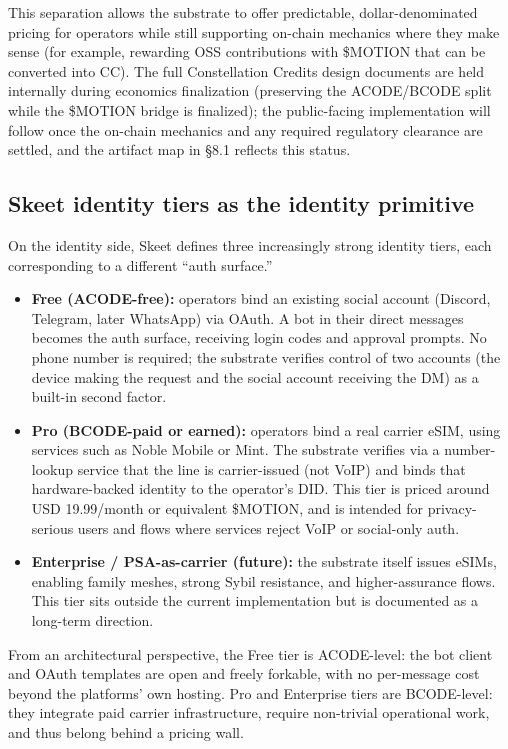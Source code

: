 \documentclass{article}
\providecommand{\tightlist}{\setlength{\itemsep}{0pt}\setlength{\parskip}{0pt}}
\begin{document}
This separation allows the substrate to offer predictable,
dollar-denominated pricing for operators while still supporting on-chain
mechanics where they make sense (for example, rewarding OSS
contributions with \$MOTION that can be converted into CC). The full
Constellation Credits design documents are held internally during
economics finalization (preserving the ACODE/BCODE split while the
\$MOTION bridge is finalized); the public-facing implementation will
follow once the on-chain mechanics and any required regulatory clearance
are settled, and the artifact map in §8.1 reflects this status.

\subsection{Skeet identity tiers as the identity
primitive}\label{skeet-identity-tiers-as-the-identity-primitive}

On the identity side, Skeet defines three increasingly strong identity
tiers, each corresponding to a different ``auth surface.''

\begin{itemize}
\tightlist
\item
  \textbf{Free (ACODE-free):} operators bind an existing social account
  (Discord, Telegram, later WhatsApp) via OAuth. A bot in their direct
  messages becomes the auth surface, receiving login codes and approval
  prompts. No phone number is required; the substrate verifies control
  of two accounts (the device making the request and the social account
  receiving the DM) as a built-in second factor.
\item
  \textbf{Pro (BCODE-paid or earned):} operators bind a real carrier
  eSIM, using services such as Noble Mobile or Mint. The substrate
  verifies via a number-lookup service that the line is carrier-issued
  (not VoIP) and binds that hardware-backed identity to the operator's
  DID. This tier is priced around USD 19.99/month or equivalent
  \$MOTION, and is intended for privacy-serious users and flows where
  services reject VoIP or social-only auth.
\item
  \textbf{Enterprise / PSA-as-carrier (future):} the substrate itself
  issues eSIMs, enabling family meshes, strong Sybil resistance, and
  higher-assurance flows. This tier sits outside the current
  implementation but is documented as a long-term direction.
\end{itemize}

From an architectural perspective, the Free tier is ACODE-level: the bot
client and OAuth templates are open and freely forkable, with no
per-message cost beyond the platforms' own hosting. Pro and Enterprise
tiers are BCODE-level: they integrate paid carrier infrastructure,
require non-trivial operational work, and thus belong behind a pricing
wall.
\end{document}
